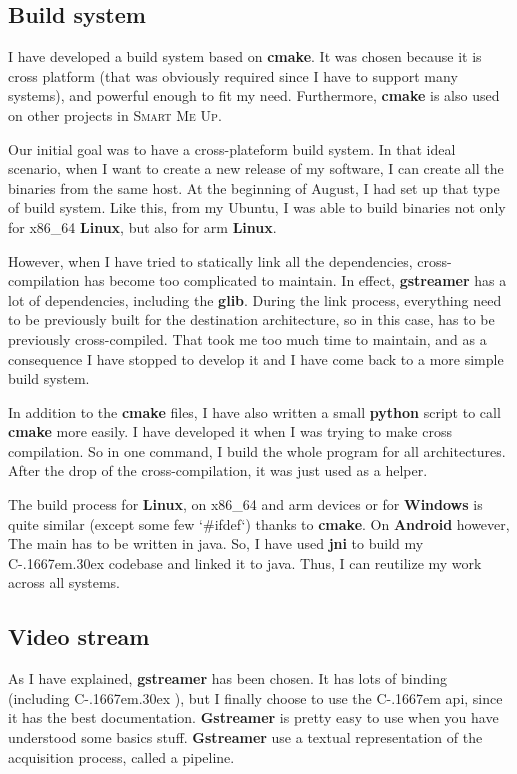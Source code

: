 \documentclass[a4paper,11pt]{custom}
\newcommand{\smu}{\textsc{Smart Me Up}\xspace}
\newcommand{\gstreamer}{\textbf{gstreamer}\xspace}
\newcommand{\Gstreamer}{\textbf{Gstreamer}\xspace}
\newcommand{\cmake}{\textbf{cmake}\xspace}
\newcommand{\jni}{\textbf{jni}\xspace}
\newcommand{\python}{\textbf{python}\xspace}
\newcommand{\linux}{\textbf{Linux}\xspace}
\newcommand{\win}{\textbf{Windows}\xspace}
\newcommand{\android}{\textbf{Android}\xspace}
\newcommand{\cpp}{%
  C\kern-.1667em\raise.30ex\hbox{\smaller{++}}%
  \spacefactor1000\xspace%
}
\newcommand{\clang}{%
  C\kern-.1667em%
  \xspace%
}
\begin{document}
\subsection{Build system}

I have developed a build system based on \cmake. It was chosen because it is
cross platform (that was obviously required since I have to support many
systems), and powerful enough to fit my need. Furthermore, \cmake is also used on
other projects in \smu.

Our initial goal was to have a cross-plateform build system. In that ideal
scenario, when I want to create a new release of my software, I can create all
the binaries from the same host. At the beginning of August, I had set up that
type of build system. Like this, from my Ubuntu, I was able to build binaries
not only for x86\_64 \linux, but also for arm \linux.

However, when I have tried to statically link all the dependencies,
cross-compilation has become too complicated to maintain. In effect, \gstreamer
has a lot of dependencies, including the \textbf{glib}. During the link process,
everything need to be previously built for the destination architecture, so in
this case, has to be previously cross-compiled. That took me too much time to
maintain, and as a consequence I have stopped to develop it and I have come
back to a more simple build system.

In addition to the \cmake files, I have also written a small \python script
to call \cmake more easily. I have developed it when I was trying to make
cross compilation. So in one command, I build the whole program for all
architectures. After the drop of the cross-compilation, it was just used as a
helper.

The build process for \linux, on x86\_64 and arm devices or for \win{} is quite
similar (except some few `\#ifdef`) thanks to \cmake. On \android{} however,
The main has to be written in java. So, I have used \jni{} to build my \cpp{}
codebase and linked it to java. Thus, I can reutilize my work across all systems.

\subsection{Video stream}

As I have explained, \gstreamer has been chosen. It has lots of binding
(including \cpp), but I finally choose to use the \clang api, since it has the
best documentation. \Gstreamer is pretty easy to use when you have understood
some basics stuff. \Gstreamer use a textual representation of the acquisition
process, called a pipeline.
\end{document}
